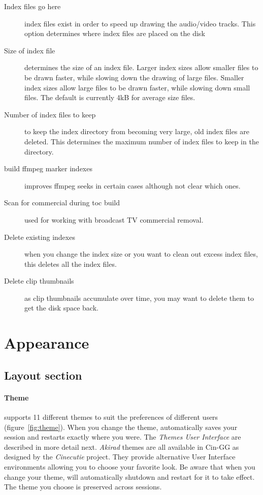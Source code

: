 \begin{description}
    \item[Index files go here]  index files exist in order to speed up drawing the audio/video tracks. This option determines where index files are placed on the disk
    \item[Size of index file]  determines the size of an index file. Larger index sizes allow smaller files to be drawn faster, while slowing down the drawing of large files. Smaller index sizes allow large files to be drawn faster, while slowing down small files.  The default is currently 4kB for average size files.
    \item[Number of index files to keep]  to keep the index directory from becoming very large, old index files are deleted. This determines the maximum number of index files to keep in the directory.
    \item[build ffmpeg marker indexes]  improves ffmpeg seeks in certain cases although not clear which ones.
    \item[Scan for commercial during toc build] used for working with broadcast TV commercial removal.
    \item[Delete existing indexes]  when you change the index size or you want to clean out excess index files, this deletes all the index files.
    \item[Delete clip thumbnails]  as clip thumbnails accumulate over time, you may want to delete them to get the disk space back.
\end{description}

\section{Appearance}%
\label{sec:appearance}

\subsection{Layout section}%
\label{sub:layout_section}

\paragraph{Theme}  \CGG{} supports 11 different themes to suit the preferences of different
users (figure~\ref{fig:theme}).  When you change the theme, \CGG{} automatically saves your
session and restarts exactly where you were.  The \textit{Themes User Interface} are described
in more detail next.  \textit{Akirad} themes are all available in Cin-GG as designed by the
\textit{Cinecutie} project.  They provide alternative User Interface environments allowing
you to choose your favorite look.  Be aware that when you change your theme, \CGG{} will
automatically shutdown and restart for it to take effect.  The theme you choose is preserved
across sessions.

